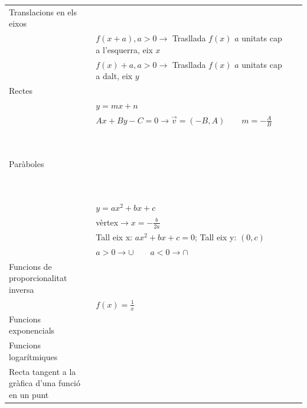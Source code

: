 \documentclass{article}
\begin{document}
\begin{center}
\begin{longtable}{ | l |l|l|}
    Translacions en els eixos& & \\
    & $f(x+a), a>0\rightarrow$ Trasllada $f(x)$ $a$ unitats cap a l'esquerra, eix $x$& \\
    & $f(x)+a, a>0\rightarrow$ Trasllada $f(x)$ $a$ unitats cap a dalt, eix $y$& \\
    \hline
    Rectes& & \\
    &$y=mx+n$&\\
    &$Ax+By-C=0\rightarrow \overrightarrow{v}=(-B,A)\qquad m=-\frac{A}{B}$&\\
    \hline
    Paràboles& & \includegraphics[width=0.2\textwidth, height=30mm]{eq_2n_grau.png}\\
    &$y=ax^2+bx+c$&\\
    &vèrtex$\rightarrow x=-\frac{b}{2a}$&\\
    &Tall eix x: $ax^2+bx+c=0$; Tall eix y: $(0,c)$&\\
    &$a>0\rightarrow \cup \qquad a<0\rightarrow \cap$&\\
     \hline
    Funcions de proporcionalitat inversa& & \\
    &$f(x)=\frac{1}{x}$&\\
    \hline
    Funcions exponencials& & \\
    \hline
    Funcions logarítmiques& & \\
        \hline
    Recta tangent a la gràfica d'una funció en un punt& & \\
\hline
	\end{longtable}
\end{center}
\end{document}
